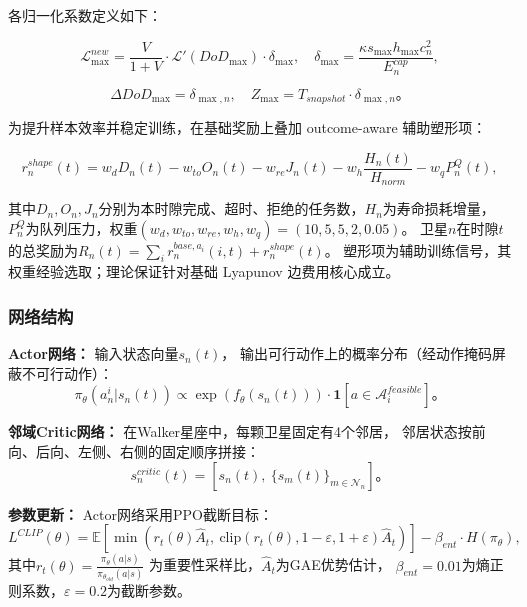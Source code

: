 \documentclass[a4paper,11pt]{article}
\begin{document}
各归一化系数定义如下：

\begin{equation}
\mathcal{L}^{new}_{\max} = \frac{V}{1+V}\cdot
\mathcal{L}'(DoD_{\max})\cdot\delta_{\max},
\quad
\delta_{\max} = \frac{\kappa s_{\max} h_{\max} c^2_n}{E^{cap}_n},
\label{eq:norm1}
\end{equation}

\begin{equation}
\Delta DoD_{\max} = \delta_{\max,n},
\quad
Z_{\max} = T_{snapshot}\cdot\delta_{\max,n}。
\label{eq:norm2}
\end{equation}

为提升样本效率并稳定训练，在基础奖励上叠加 outcome-aware 辅助塑形项：

\begin{equation}
r^{shape}_n(t) = w_d D_n(t) - w_{to} O_n(t) - w_{re} J_n(t)
- w_h \frac{H_n(t)}{H_{norm}} - w_q P^{Q}_n(t),
\label{eq:reward_shape}
\end{equation}

其中$D_n, O_n, J_n$分别为本时隙完成、超时、拒绝的任务数，$H_n$为寿命损耗增量，
$P^Q_n$为队列压力，权重$(w_d, w_{to}, w_{re}, w_h, w_q) = (10, 5, 5, 2, 0.05)$。
卫星$n$在时隙$t$的总奖励为$R_n(t) = \sum_i r^{base,a_i}_n(i,t) + r^{shape}_n(t)$。
塑形项为辅助训练信号，其权重经验选取；理论保证针对基础 Lyapunov 边费用核心成立。

\subsubsection{网络结构}

\textbf{Actor网络：}
输入状态向量$s_n(t)$，
输出可行动作上的概率分布（经动作掩码屏蔽不可行动作）：
\begin{equation}
\pi_\theta(a^i_n | s_n(t))
\propto \exp(f_\theta(s_n(t)))
\cdot \mathbf{1}[a \in \mathcal{A}^{feasible}_i]。
\label{eq:actor}
\end{equation}

\textbf{邻域Critic网络：}
在Walker星座中，每颗卫星固定有4个邻居，
邻居状态按前向、后向、左侧、右侧的固定顺序拼接：
\begin{equation}
s^{critic}_n(t) = [s_n(t),\
\{s_m(t)\}_{m \in \mathcal{N}_n}]。
\label{eq:critic_input}
\end{equation}

\textbf{参数更新：}
Actor网络采用PPO截断目标：
\begin{equation}
L^{CLIP}(\theta) = \mathbb{E}\left[
\min\left(r_t(\theta)\hat{A}_t,\
\text{clip}(r_t(\theta), 1-\varepsilon, 1+\varepsilon)\hat{A}_t
\right)
\right] - \beta_{ent}\cdot H(\pi_\theta),
\label{eq:ppo}
\end{equation}
其中$r_t(\theta) = \frac{\pi_\theta(a|s)}{\pi_{\theta_{old}}(a|s)}$
为重要性采样比，$\hat{A}_t$为GAE优势估计，
$\beta_{ent}=0.01$为熵正则系数，$\varepsilon=0.2$为截断参数。
\end{document}

